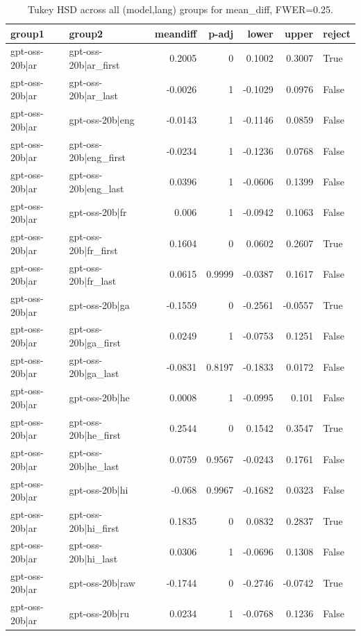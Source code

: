 \begin{table}
\caption{Tukey HSD across all (model,lang) groups for mean_diff, FWER=0.25.}
\label{tab:tukey_all_models_all_langs_mean_diff}
\begin{tabular}{l l r r r r l}
\toprule
group1 & group2 & meandiff & p-adj & lower & upper & reject \\
\midrule
gpt-oss-20b|ar & gpt-oss-20b|ar_first & 0.2005 & 0 & 0.1002 & 0.3007 & True \\
gpt-oss-20b|ar & gpt-oss-20b|ar_last & -0.0026 & 1 & -0.1029 & 0.0976 & False \\
gpt-oss-20b|ar & gpt-oss-20b|eng & -0.0143 & 1 & -0.1146 & 0.0859 & False \\
gpt-oss-20b|ar & gpt-oss-20b|eng_first & -0.0234 & 1 & -0.1236 & 0.0768 & False \\
gpt-oss-20b|ar & gpt-oss-20b|eng_last & 0.0396 & 1 & -0.0606 & 0.1399 & False \\
gpt-oss-20b|ar & gpt-oss-20b|fr & 0.006 & 1 & -0.0942 & 0.1063 & False \\
gpt-oss-20b|ar & gpt-oss-20b|fr_first & 0.1604 & 0 & 0.0602 & 0.2607 & True \\
gpt-oss-20b|ar & gpt-oss-20b|fr_last & 0.0615 & 0.9999 & -0.0387 & 0.1617 & False \\
gpt-oss-20b|ar & gpt-oss-20b|ga & -0.1559 & 0 & -0.2561 & -0.0557 & True \\
gpt-oss-20b|ar & gpt-oss-20b|ga_first & 0.0249 & 1 & -0.0753 & 0.1251 & False \\
gpt-oss-20b|ar & gpt-oss-20b|ga_last & -0.0831 & 0.8197 & -0.1833 & 0.0172 & False \\
gpt-oss-20b|ar & gpt-oss-20b|he & 0.0008 & 1 & -0.0995 & 0.101 & False \\
gpt-oss-20b|ar & gpt-oss-20b|he_first & 0.2544 & 0 & 0.1542 & 0.3547 & True \\
gpt-oss-20b|ar & gpt-oss-20b|he_last & 0.0759 & 0.9567 & -0.0243 & 0.1761 & False \\
gpt-oss-20b|ar & gpt-oss-20b|hi & -0.068 & 0.9967 & -0.1682 & 0.0323 & False \\
gpt-oss-20b|ar & gpt-oss-20b|hi_first & 0.1835 & 0 & 0.0832 & 0.2837 & True \\
gpt-oss-20b|ar & gpt-oss-20b|hi_last & 0.0306 & 1 & -0.0696 & 0.1308 & False \\
gpt-oss-20b|ar & gpt-oss-20b|raw & -0.1744 & 0 & -0.2746 & -0.0742 & True \\
gpt-oss-20b|ar & gpt-oss-20b|ru & 0.0234 & 1 & -0.0768 & 0.1236 & False \\

\end{tabular}
\end{table}
